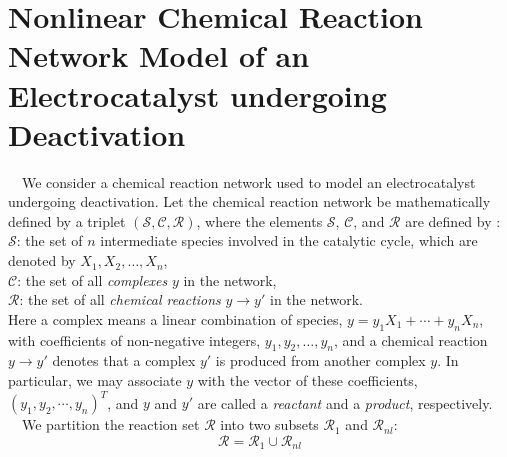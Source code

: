 \documentclass[11pt,a4paper]{article}
\begin{document}
\section{Nonlinear Chemical Reaction Network Model of an Electrocatalyst undergoing Deactivation}\label{CRNT}
~~We consider a chemical reaction network used to model an electrocatalyst undergoing deactivation. Let the chemical reaction network be mathematically defined by a triplet $(\mathcal{S}, \mathcal{C}, \mathcal{R})$, where the elements $\mathcal{S}$, $\mathcal{C}$, and $\mathcal{R}$ are defined by \cite{Feinberg}:\\[0.1cm]
$\mathcal{S}$: the set of $n$ intermediate species involved in the catalytic cycle, which are denoted by $X_1,X_2,\dots,X_n$,\\[0.2cm]
$\mathcal{C}$: the set of all {\it complexes} $y$ in the network,\\[0.2cm]
$\mathcal{R}$: the set of all {\it chemical reactions} $y \to y'$ in the network.\\[0.2cm] \noindent
Here a complex means a linear combination of species, $y=y_1X_1+\cdots+y_nX_n$, with coefficients of non-negative integers, $y_1,y_2,\ldots,y_n $, and a chemical reaction $y \to y'$ denotes that a complex $y'$ is produced from another complex $y$. In particular, we may associate $y$ with the vector of these coefficients, $(y_1,y_2,\cdots,y_n)^T$, and $y$ and $y'$ are called a {\it reactant} and a {\it product}, respectively.\\
~~We partition the reaction set $\mathcal{R}$ into two subsets $\mathcal{R}_1$ and $\mathcal{R}_{nl}$:
\begin{equation}
\mathcal{R} = \mathcal{R}_1 \cup \mathcal{R}_{nl} \label{eq:partition}
\end{equation}
\end{document}

